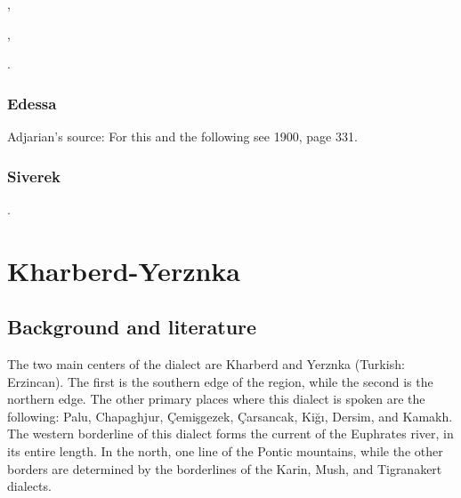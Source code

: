 ,

,

.



\subsection{Edessa}

Adjarian's source: For this and the following see  1900, page 331. 


\subsection{Siverek}

.



\chapter{Kharberd-Yerznka} \label{chapter:Kharberd-Yerznka}

\section{Background and literature}
\begin{adjarianpage}\label{page:167}\end{adjarianpage}%

The two main centers of the dialect are Kharberd and Yerznka (Turkish: Erzincan). The first is the southern edge of the region, while the second is the northern edge. The other primary places where this dialect is spoken are the following: Palu, Chapaghjur, Çemişgezek, Çarsancak, Kiğı, Dersim, and Kamakh. The western borderline of this dialect forms the current of the Euphrates river, in its entire length. In the north, one line of the Pontic mountains, while the other borders are determined by the borderlines of the Karin, Mush, and Tigranakert dialects. 

